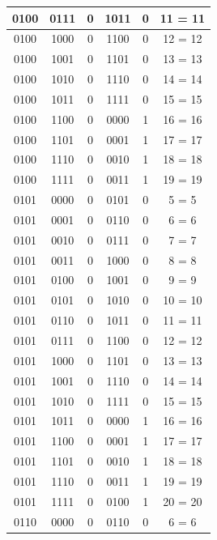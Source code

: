 \documentclass{exam}
\begin{document}
\begin{center}
\begin{longtable}{|c|c|c|c|c|c|}
                0100 & 0111 & 0 & 1011 & 0 & 11 = 11 \\ \hline
                0100 & 1000 & 0 & 1100 & 0 & 12 = 12 \\ \hline
                0100 & 1001 & 0 & 1101 & 0 & 13 = 13 \\ \hline
                0100 & 1010 & 0 & 1110 & 0 & 14 = 14 \\ \hline
                0100 & 1011 & 0 & 1111 & 0 & 15 = 15 \\ \hline
                0100 & 1100 & 0 & 0000 & 1 & 16 = 16 \\ \hline
                0100 & 1101 & 0 & 0001 & 1 & 17 = 17 \\ \hline
                0100 & 1110 & 0 & 0010 & 1 & 18 = 18 \\ \hline
                0100 & 1111 & 0 & 0011 & 1 & 19 = 19 \\ \hline
                0101 & 0000 & 0 & 0101 & 0 & 5 = 5 \\ \hline
                0101 & 0001 & 0 & 0110 & 0 & 6 = 6 \\ \hline
                0101 & 0010 & 0 & 0111 & 0 & 7 = 7 \\ \hline
                0101 & 0011 & 0 & 1000 & 0 & 8 = 8 \\ \hline
                0101 & 0100 & 0 & 1001 & 0 & 9 = 9 \\ \hline
                0101 & 0101 & 0 & 1010 & 0 & 10 = 10 \\ \hline
                0101 & 0110 & 0 & 1011 & 0 & 11 = 11 \\ \hline
                0101 & 0111 & 0 & 1100 & 0 & 12 = 12 \\ \hline
                0101 & 1000 & 0 & 1101 & 0 & 13 = 13 \\ \hline
                0101 & 1001 & 0 & 1110 & 0 & 14 = 14 \\ \hline
                0101 & 1010 & 0 & 1111 & 0 & 15 = 15 \\ \hline
                0101 & 1011 & 0 & 0000 & 1 & 16 = 16 \\ \hline
                0101 & 1100 & 0 & 0001 & 1 & 17 = 17 \\ \hline
                0101 & 1101 & 0 & 0010 & 1 & 18 = 18 \\ \hline
                0101 & 1110 & 0 & 0011 & 1 & 19 = 19 \\ \hline
                0101 & 1111 & 0 & 0100 & 1 & 20 = 20 \\ \hline
                0110 & 0000 & 0 & 0110 & 0 & 6 = 6 \\ \hline

\end{longtable}
\end{center}
\end{document}

